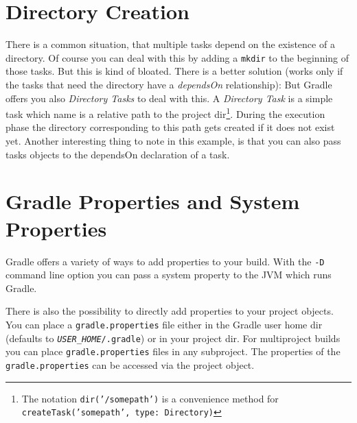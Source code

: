 \section{Directory Creation} %
\label{sec:directory_creation}
There is a common situation, that multiple tasks depend on the existence of a directory. Of course you can deal with this by adding a \texttt{mkdir} to the beginning of those tasks. But this is kind of bloated. 
There is a better solution (works only if the tasks that need the directory have a \emph{dependsOn} relationship):
But Gradle offers you also \emph{Directory Tasks} to deal with this.
A \emph{Directory Task} is a simple task which name is a relative path to the project dir\footnote{The notation \texttt{dir('/somepath')} is a convenience method for \texttt{createTask('somepath', type: Directory)}}. During the execution phase the directory corresponding to this path gets created if it does not exist yet. Another interesting thing to note in this example, is that you can also pass tasks objects to the dependsOn declaration of a task.

\section{Gradle Properties and System Properties} %
\label{sec:gradle_properties_and_system_properties}
Gradle offers a variety of ways to add properties to your build. With the \texttt{-D} command line option you can pass a system property to the JVM which runs Gradle. 

There is also the possibility to directly add properties to your project objects. You can place a \texttt{gradle.properties} file either in the Gradle user home dir (defaults to \texttt{\emph{USER\_HOME}/.gradle}) or in your project dir. For multiproject builds you can place \texttt{gradle.properties} files in any subproject. The properties of the \texttt{gradle.properties} can be accessed via the project object.

